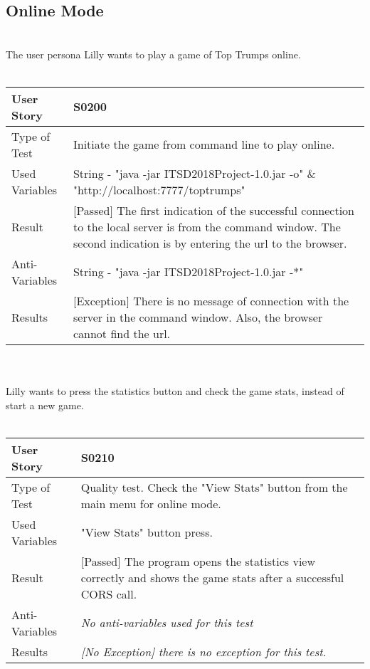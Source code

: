 \subsection{Online Mode}
\vspace{0.2cm}\\ 
The user persona Lilly wants to play a game of Top Trumps online.\\
\vspace{0.2cm}\\  
\begin{tabular}{l | p{12cm}}
User Story & \textbf{S0200}\\ \hline
Type of Test & Initiate the game from command line to play online.\\ \hline
Used Variables & String - "java -jar ITSD2018Project-1.0.jar -o" \& "http://localhost:7777/toptrumps"\\ \hline
Result & [Passed] The first indication of the successful connection to the local server is from the command window. The second indication is by entering the url to the browser.\\ \hline
Anti-Variables & String - "java -jar ITSD2018Project-1.0.jar -*"\\ \hline
Results & [Exception] There is no message of connection with the server in the command window. Also, the browser cannot find the url.\\ \hline
\end{tabular}\\
\vspace{0.2cm}\\
Lilly wants to press the statistics button and check the game stats, instead of start a new game.\\
\vspace{0.2cm}\\  
\begin{tabular}{l | p{12cm}}
User Story & \textbf{S0210}\\ \hline
Type of Test & Quality test. Check the "View Stats" button from the main menu for online mode.\\ \hline
Used Variables & "View Stats" button press.\\ \hline
Result & [Passed] The program opens the statistics view correctly and shows the game stats after a successful CORS call.\\ \hline
Anti-Variables & \textit{No anti-variables used for this test}\\ \hline
Results & \textit{[No Exception] there is no exception for this test.}\\ \hline
\end{tabular}\\

